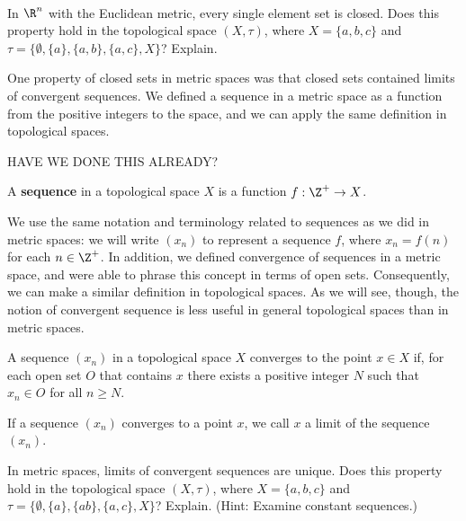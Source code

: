 \begin{pa} ~
\be
\item  In $\R^n$ with the Euclidean metric, every single element set is closed. Does this property hold in the topological space $(X, \tau)$, where $X = \{a, b, c\}$ and $\tau = \{\emptyset, \{a\}, \{a, b\}, \{a, c\}, X\}$? Explain. 

One property of closed sets in metric spaces was that closed sets contained limits of convergent sequences. We defined a sequence in a metric space as a function from the positive integers to the space, and we can apply the same definition in topological spaces.

HAVE WE DONE THIS ALREADY?

\begin{definition} A \textbf{sequence} in a topological space $X$ is a function $f : \Z^+ \to X$.
\end{definition}

We use the same notation and terminology related to sequences as we did in metric spaces: we will write $(x_n)$ to represent a sequence $f$, where $x_n = f(n)$ for each $n \in \Z^+$. In addition, we defined convergence of sequences in a metric space, and were able to phrase this concept in terms of open sets. Consequently, we can make a similar definition in topological spaces. As we will see, though, the notion of convergent sequence is less useful in general topological spaces than in metric spaces.
\begin{definition}  A sequence $(x_n)$ in a topological space $X$ converges to the point $x \in X$ if, for each open set $O$ that contains $x$ there exists a positive integer $N$ such that $x_n \in O$ for all $n \geq N$.
\end{definition}

If a sequence $(x_n)$ converges to a point $x$, we call $x$ a limit of the sequence $(x_n)$.

\item In metric spaces, limits of convergent sequences are unique. Does this property hold in the topological space $(X,\tau)$, where $X = \{a, b, c\}$ and $\tau = \{\emptyset, \{a\}, \{a b\}, \{a, c\}, X\}$? Explain. (Hint: Examine constant sequences.)



\end{pa}

